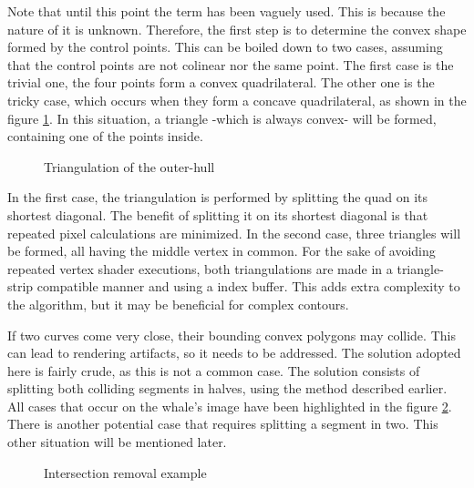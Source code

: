 \documentclass[\topdir/main.tex]{subfiles}
\begin{document}
Note that until this point the term  has been vaguely used. This is because the nature of it is unknown. Therefore, the first step is to determine the convex shape formed by the control points. This can be boiled down to two cases, assuming that the control points are not colinear nor the same point. The first case is the trivial one, the four points form a convex quadrilateral. The other one is the tricky case, which occurs when they form a concave quadrilateral, as shown in the figure \ref{fig:a01:quad_triang}. In this situation, a triangle -which is always convex- will be formed, containing one of the points inside.\newline

\begin{figure}[hbtp]
    \centering

    \caption{Triangulation of the outer-hull}
    \label{fig:a01:quad_triang}
\end{figure}

In the first case, the triangulation is performed by splitting the quad on its shortest diagonal. The benefit of splitting it on its shortest diagonal is that repeated pixel calculations are minimized. In the second case, three triangles will be formed, all having the middle vertex in common. For the sake of avoiding repeated vertex shader executions, both triangulations are made in a triangle-strip compatible manner and using a index buffer. This adds extra complexity to the algorithm, but it may be beneficial for complex contours.\newline

If two curves come very close, their bounding convex polygons may collide. This can lead to rendering artifacts, so it needs to be addressed. The solution adopted here is fairly crude, as this is not a common case. The solution consists of splitting both colliding segments in halves, using the method described earlier. All cases that occur on the whale's image have been highlighted in the figure \ref{fig:a01:whale_intersections}. There is another potential case that requires splitting a segment in two. This other situation will be mentioned later.\newline

\begin{figure}[hbtp]
    \centering

    \caption{Intersection removal example}
    \label{fig:a01:whale_intersections}
\end{figure}
\end{document}

